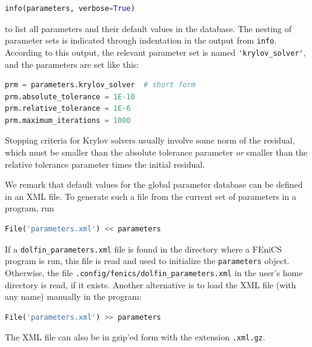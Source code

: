 \documentclass[graybox,envcountchap,sectrefs,final]{svmonodo}
\begin{document}
\begin{lstlisting}[language=Python,style=graycolor]
info(parameters, verbose=True)
\end{lstlisting}
to list all parameters and their default values in the database.
The nesting of parameter sets is indicated through indentation in the
output from \texttt{info}.
According to this output, the relevant parameter set is
named \Verb!'krylov_solver'!, and the parameters are set like this:

\begin{lstlisting}[language=Python,style=graycolor]
prm = parameters.krylov_solver  # short form
prm.absolute_tolerance = 1E-10
prm.relative_tolerance = 1E-6
prm.maximum_iterations = 1000
\end{lstlisting}
Stopping criteria for Krylov solvers usually involve some norm of
the residual, which must be smaller than the absolute tolerance
parameter \emph{or} smaller than the relative tolerance parameter times
the initial residual.

%

We remark that default values for the global parameter database can be
defined in an XML file. To generate such a file from the current set
of parameters in a program, run

\begin{lstlisting}[language=Python,style=graycolor]
File('parameters.xml') << parameters
\end{lstlisting}
If a \Verb!dolfin_parameters.xml! file is found in the directory where a
FEniCS program is run, this file is read and used to initialize the
\texttt{parameters} object. Otherwise, the file
\Verb!.config/fenics/dolfin_parameters.xml! in the user's home directory is
read, if it exists.  Another alternative is to load the XML file (with any
name) manually in the program:

\begin{lstlisting}[language=Python,style=graycolor]
File('parameters.xml') >> parameters
\end{lstlisting}
The XML file can also be in gzip'ed form with the extension \texttt{.xml.gz}.
\end{document}
